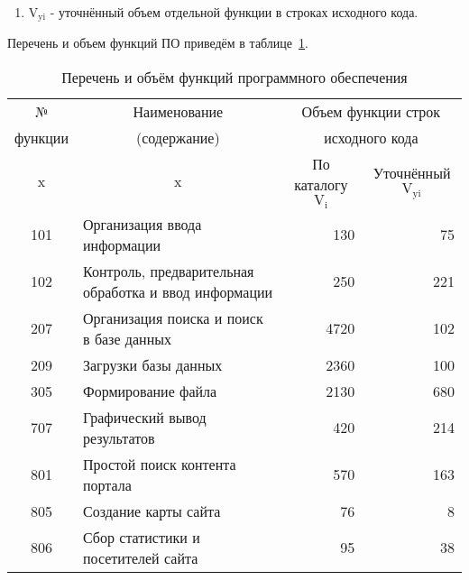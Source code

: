 \begin{enumerate}
    \item[] $\text{V}_\text{yi}$ - уточнённый объем отдельной функции в строках исходного кода.
\end{enumerate}

Перечень и объем функций ПО приведём в таблице~\ref{tab:vPO}.

\begin{table}[h!]
    \centering\small

    \caption{Перечень и объём функций программного обеспечения}
    \label{tab:vPO}

    \begin{tabular}{|p{1cm}|p{8.5cm}|p{3cm}|p{3cm}|} 
        \hline
        \multicolumn{1}{|c|}{№}
        & \multicolumn{1}{c|}{Наименование}
        & \multicolumn{2}{c|}{Объем функции строк} \\

        \multicolumn{1}{|c|}{функции}
        & \multicolumn{1}{c|}{(содержание)}
        & \multicolumn{2}{c|}{исходного кода} \\ \hline

        \multicolumn{1}{|c|}{x}
        & \multicolumn{1}{c|}{x}
        & \multicolumn{1}{c|}{По каталогу $\text{V}_\text{i}$}
        & \multicolumn{1}{c|}{Уточнённый $\text{V}_\text{yi}$} \\ \hline

        \multicolumn{1}{|c|}{101} & Организация ввода информации                            & \multicolumn{1}{r|}{130 } & \multicolumn{1}{r|}{75  } \\ \hline
        \multicolumn{1}{|c|}{102} & Контроль, предварительная обработка и ввод информации   & \multicolumn{1}{r|}{250 } & \multicolumn{1}{r|}{221 } \\ \hline
        \multicolumn{1}{|c|}{207} & Организация поиска и поиск в базе данных                & \multicolumn{1}{r|}{4720} & \multicolumn{1}{r|}{102 } \\ \hline
        \multicolumn{1}{|c|}{209} & Загрузки базы данных                                    & \multicolumn{1}{r|}{2360} & \multicolumn{1}{r|}{100 } \\ \hline
        \multicolumn{1}{|c|}{305} & Формирование файла                                      & \multicolumn{1}{r|}{2130} & \multicolumn{1}{r|}{680 } \\ \hline
        \multicolumn{1}{|c|}{707} & Графический вывод результатов                           & \multicolumn{1}{r|}{420 } & \multicolumn{1}{r|}{214 } \\ \hline
        \multicolumn{1}{|c|}{801} & Простой поиск контента портала                          & \multicolumn{1}{r|}{570 } & \multicolumn{1}{r|}{163 } \\ \hline
        \multicolumn{1}{|c|}{805} & Создание карты сайта                                    & \multicolumn{1}{r|}{76  } & \multicolumn{1}{r|}{8   } \\ \hline
        \multicolumn{1}{|c|}{806} & Сбор статистики и посетителей сайта                     & \multicolumn{1}{r|}{95  } & \multicolumn{1}{r|}{38  } \\ \hline


\end{tabular}
\end{table}
